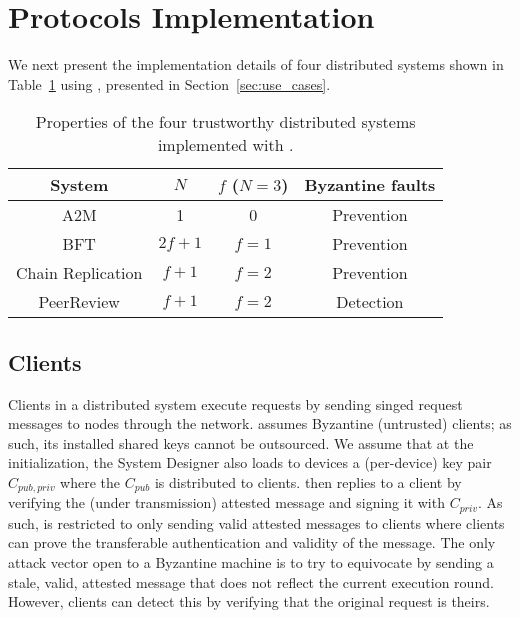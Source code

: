 \section{Protocols Implementation}\label{sec:use_cases-appendix}
We next present the implementation details of four distributed systems shown in Table~\ref{tab:use_cases_options} using \projecttitle{}, presented in Section~\ref{sec:use_cases}.

\begin{table}
\begin{center}
\small
\begin{tabular}{ |c|c|c|c| } 
 \hline
 System & $N$ & $f$ ($N=3$) & Byzantine faults \\ [0.5ex] \hline \hline
 A2M    & 1 & 0 & Prevention\\
 BFT &  $2f+1$ & $f=1$ & Prevention\\
 Chain Replication &  $f+1$ & $f=2$ & Prevention\\
 PeerReview & $f+1$ & $f=2$ & Detection\\
 \hline
\end{tabular}
\end{center}
\caption{Properties of the four trustworthy distributed systems implemented with \projecttitle{}.}
\label{tab:use_cases_options}
\end{table}

\subsection{Clients} Clients in a \projecttitle{} distributed system execute requests by sending singed request messages to \projecttitle{} nodes through the network. \projecttitle{} assumes Byzantine (untrusted) clients; as such, its installed shared keys cannot be outsourced. We assume that at the initialization, the System Designer also loads to \projecttitle{} devices a (per-device) key pair $C_{pub, priv}$ where the $C_{pub}$ is distributed to clients. \projecttitle{} then replies to a client by verifying the (under transmission) attested message and signing it with $C_{priv}$. As such, \projecttitle{} is restricted to only sending valid attested messages to clients where clients can prove the transferable authentication and validity of the message. The only attack vector open to a Byzantine machine is to try to equivocate by sending a stale, valid, attested message that does not reflect the current execution round. However, clients can detect this by verifying that the original request is theirs.    %

